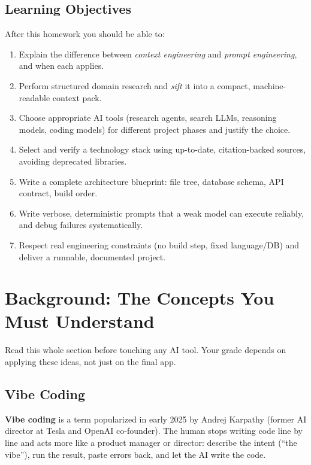 \documentclass[11pt,a4paper]{article}
\begin{document}
\subsection{Learning Objectives}
After this homework you should be able to:
\begin{enumerate}[label=\textbf{LO\arabic*.}]
\item Explain the difference between \emph{context engineering} and \emph{prompt engineering}, and when each applies.
\item Perform structured domain research and \emph{sift} it into a compact, machine-readable context pack.
\item Choose appropriate AI tools (research agents, search LLMs, reasoning models, coding models) for different project phases and justify the choice.
\item Select and verify a technology stack using up-to-date, citation-backed sources, avoiding deprecated libraries.
\item Write a complete architecture blueprint: file tree, database schema, API contract, build order.
\item Write verbose, deterministic prompts that a weak model can execute reliably, and debug failures systematically.
\item Respect real engineering constraints (no build step, fixed language/DB) and deliver a runnable, documented project.
\end{enumerate}

\section{Background: The Concepts You Must Understand}
Read this whole section before touching any AI tool. Your grade depends on applying these ideas, not just on the final app.

\subsection{Vibe Coding}
\textbf{Vibe coding} is a term popularized in early 2025 by Andrej Karpathy (former AI director at Tesla and OpenAI co-founder). The human stops writing code line by line and acts more like a product manager or director: describe the intent (``the vibe''), run the result, paste errors back, and let the AI write the code.
\end{document}
